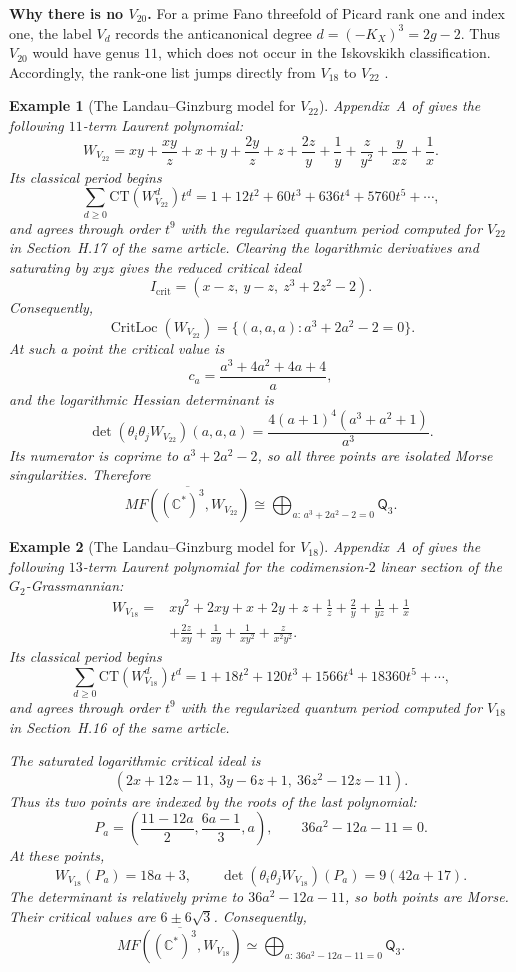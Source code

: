 \documentclass[11pt]{amsart}
\newtheorem{example}{Example}[section]
\DeclareMathOperator{\CritLoc}{CritLoc}
\newcommand{\MorseCat}[1]{\mathsf{Q}_{#1}}
\begin{document}
\medskip
\noindent\textbf{Why there is no $V_{20}$.}
For a prime Fano threefold of Picard rank one and index one, the label $V_d$
records the anticanonical degree $d=(-K_X)^3=2g-2$.  Thus $V_{20}$ would
have genus $11$, which does not occur in the Iskovskikh classification.
Accordingly, the rank-one list jumps directly from $V_{18}$ to $V_{22}$
\cite{Iskovskikh1977FanoI,Iskovskikh1978FanoII,
CoatesCortiGalkinKasprzyk2016}.

\begin{example}[The Landau--Ginzburg model for $V_{22}$]
Appendix~A of \cite{CoatesCortiGalkinKasprzyk2016} gives the following
$11$-term Laurent polynomial:
\[
W_{V_{22}}=xy+\frac{xy}{z}+x+y+\frac{2y}{z}+z
+\frac{2z}{y}+\frac1y+\frac{z}{y^2}+\frac{y}{xz}+\frac1x.
\]
Its classical period begins
\[
\sum_{d\geq0}\mathrm{CT}(W_{V_{22}}^d)t^d
=1+12t^2+60t^3+636t^4+5760t^5+\cdots,
\]
and agrees through order $t^9$ with the regularized quantum period computed
for $V_{22}$ in Section~H.17 of the same article.
Clearing the logarithmic derivatives and saturating by $xyz$ gives the reduced
critical ideal
\[
I_{\mathrm{crit}}=(x-z,\ y-z,\ z^3+2z^2-2).
\]
Consequently,
\[
\CritLoc(W_{V_{22}})=
\{(a,a,a):a^3+2a^2-2=0\}.
\]
At such a point the critical value is
\[
c_a=\frac{a^3+4a^2+4a+4}{a},
\]
and the logarithmic Hessian determinant is
\[
\det(\theta_i\theta_jW_{V_{22}})(a,a,a)
=\frac{4(a+1)^4(a^3+a^2+1)}{a^3}.
\]
Its numerator is coprime to $a^3+2a^2-2$, so all three points are isolated
Morse singularities. Therefore
\[
\overline{MF((\mathbb{C}^*)^3,W_{V_{22}})}
\cong \bigoplus_{a:\,a^3+2a^2-2=0}\MorseCat{3}.
\]
\end{example}

\begin{example}[The Landau--Ginzburg model for $V_{18}$]
Appendix~A of \cite{CoatesCortiGalkinKasprzyk2016} gives the following
$13$-term Laurent polynomial for the codimension-$2$ linear section of the
$G_2$-Grassmannian:
\[
\begin{aligned}
W_{V_{18}}={}&xy^2+2xy+x+2y+z+\frac1z+\frac2y+\frac1{yz}
+\frac1x\\
&+\frac{2z}{xy}+\frac1{xy}+\frac1{xy^2}+\frac{z}{x^2y^2}.
\end{aligned}
\]
Its classical period begins
\[
\sum_{d\geq0}\mathrm{CT}(W_{V_{18}}^d)t^d
=1+18t^2+120t^3+1566t^4+18360t^5+\cdots,
\]
and agrees through order $t^9$ with the regularized quantum period computed
for $V_{18}$ in Section~H.16 of the same article.

The saturated logarithmic critical ideal is
\[
(2x+12z-11,\ 3y-6z+1,\ 36z^2-12z-11).
\]
Thus its two points are indexed by the roots of the last polynomial:
\[
P_a=\left(\frac{11-12a}{2},\frac{6a-1}{3},a\right),
\qquad
36a^2-12a-11=0.
\]
At these points,
\[
W_{V_{18}}(P_a)=18a+3,
\qquad
\det(\theta_i\theta_jW_{V_{18}})(P_a)=9(42a+17).
\]
The determinant is relatively prime to $36a^2-12a-11$, so both points are
Morse. Their critical values are $6\pm6\sqrt3$. Consequently,
\[
\overline{MF((\mathbb C^*)^3,W_{V_{18}})}
\simeq
\bigoplus_{a:\,36a^2-12a-11=0}\MorseCat{3}.
\]
\end{example}
\end{document}
